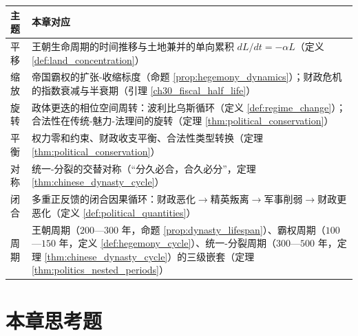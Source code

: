 \begin{center}
\begin{tabular}{>{\centering\arraybackslash}p{2.2cm}>{\centering\arraybackslash}p{10.5cm}}
\toprule
主题 & 本章对应 \\
\midrule
平移 & 王朝生命周期的时间推移与土地兼并的单向累积 $dL/dt = -\alpha L$（定义 \ref{def:land_concentration}） \\
缩放 & 帝国霸权的扩张-收缩标度（命题 \ref{prop:hegemony_dynamics}）；财政危机的指数衰减与半衰期（引理 \ref{ch30_fiscal_half_life}） \\
旋转 & 政体更迭的相位空间周转：波利比乌斯循环（定义 \ref{def:regime_change}）；合法性在传统-魅力-法理间的旋转（定理 \ref{thm:political_conservation}） \\
平衡 & 权力零和约束、财政收支平衡、合法性类型转换（定理 \ref{thm:political_conservation}） \\
对称 & 统一-分裂的交替对称（“分久必合，合久必分”，定理 \ref{thm:chinese_dynasty_cycle}） \\
闭合 & 多重正反馈的闭合因果循环：财政恶化$\to$精英叛离$\to$军事削弱$\to$财政更恶化（定义 \ref{def:political_quantities}） \\
周期 & 王朝周期（$200$—$300$ 年，命题 \ref{prop:dynasty_lifespan}）、霸权周期（$100$—$150$ 年，定义 \ref{def:hegemony_cycle}）、统一-分裂周期（$300$—$500$ 年，定理 \ref{thm:chinese_dynasty_cycle}）的三级嵌套（定理 \ref{thm:politics_nested_periods}） \\
\bottomrule
\end{tabular}
\end{center}

\section*{本章思考题}

